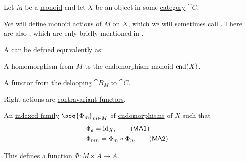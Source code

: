 \begin{definition}\label{def:monoid_action}
  Let \( M \) be a \hyperref[def:monoid]{monoid} and let \( X \) be an object in some \hyperref[def:category]{category} \( \cat{C} \).

  We will define monoid actions of \( M \) on \( X \), which we will sometimes call . There are also , which are only briefly mentioned in .

  A  can be defined equivalently as:
  \begin{thmenum}

     A \hyperref[def:monoid/homomorphism]{homomorphism} from \( M \) to the \hyperref[def:endomorphism_monoid]{endomorphism monoid} \( \operatorname{end}(X) \).

     A \hyperref[def:functor]{functor} from the \hyperref[def:monoid_delooping]{delooping} \( \cat{B}_M \) to \( \cat{C} \).

    Right actions are \hyperref[rem:contravariant_functor]{contravariant functors}.

     An \hyperref[def:cartesian_product/indexed_family]{indexed family} \( \seq{ \Phi_m }_{m \in M} \) of \hyperref[def:morphism_invertibility/endomorphism]{endomorphisms} of \( X \) such that
    \begin{align}
      &\Phi_e = \id_X, \label{eq:def:monoid_action/family/identity}\tag{\logic{MA1}} \\
      &\Phi_{mn} = \Phi_m \bincirc \Phi_n. \label{eq:def:monoid_action/family/compatibility}\tag{\logic{MA2}}
    \end{align}

    This defines a function \( \Phi: M \times A \to A \).
  \end{thmenum}
\end{definition}
